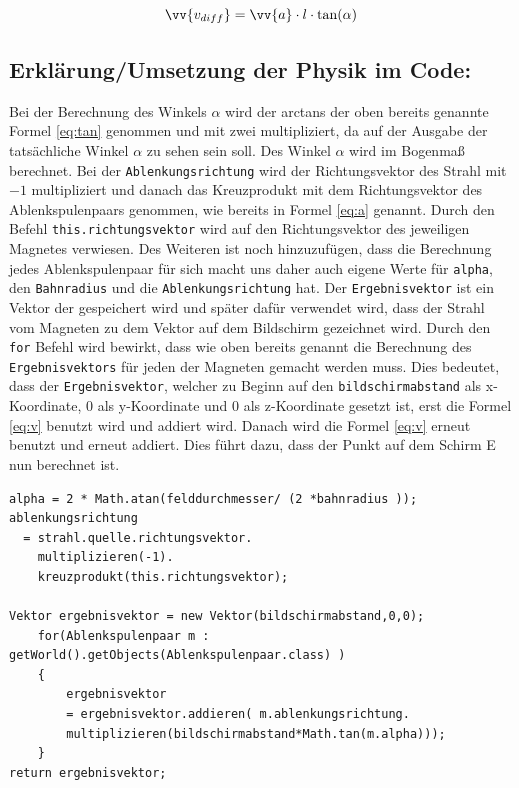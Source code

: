 \begin{equation}
    \label{eq:v}
    \vv{v_{diff}} =  \vv{a} \cdot l \cdot \tan(\alpha)
\end{equation}

\subsection{Erklärung/Umsetzung der Physik im Code:}

Bei der Berechnung des Winkels $\alpha$ wird der arctans der oben bereits genannte Formel \ref{eq:tan} genommen und mit zwei multipliziert, da auf der Ausgabe der tatsächliche Winkel $\alpha$ zu sehen sein soll.
Des Winkel $\alpha$ wird im Bogenmaß berechnet.
Bei der \lstinline$Ablenkungsrichtung$ wird der Richtungsvektor des Strahl mit $-1$ multipliziert und danach das Kreuzprodukt mit dem Richtungsvektor des Ablenkspulenpaars genommen, wie bereits in Formel \ref{eq:a} genannt.
Durch den Befehl \lstinline$this.richtungsvektor$ wird auf den Richtungsvektor des jeweiligen Magnetes verwiesen.
Des Weiteren ist noch hinzuzufügen, dass die Berechnung jedes Ablenkspulenpaar für sich macht uns daher auch eigene Werte für \lstinline$alpha$, den \lstinline$Bahnradius$ und die \lstinline$Ablenkungsrichtung$ hat.
Der \lstinline$Ergebnisvektor$ ist ein Vektor der gespeichert wird und später dafür verwendet wird, dass der Strahl vom Magneten zu dem Vektor auf dem Bildschirm gezeichnet wird.
Durch den \lstinline$for$ Befehl wird bewirkt, dass wie oben bereits genannt die Berechnung des \lstinline$Ergebnisvektors$ für jeden der Magneten gemacht werden muss.
Dies bedeutet, dass der \lstinline$Ergebnisvektor$, welcher zu Beginn auf den \lstinline$bildschirmabstand$ als x- Koordinate, $0$ als y-Koordinate und 0 als z-Koordinate gesetzt ist, erst die Formel \ref{eq:v} benutzt wird und addiert wird.
Danach wird die Formel \ref{eq:v} erneut benutzt und erneut addiert. Dies führt dazu, dass der Punkt auf dem Schirm E nun berechnet ist.

\begin{lstlisting}
alpha = 2 * Math.atan(felddurchmesser/ (2 *bahnradius ));
ablenkungsrichtung
  = strahl.quelle.richtungsvektor.
    multiplizieren(-1).
    kreuzprodukt(this.richtungsvektor);

Vektor ergebnisvektor = new Vektor(bildschirmabstand,0,0);
    for(Ablenkspulenpaar m : getWorld().getObjects(Ablenkspulenpaar.class) )
    {
        ergebnisvektor 
        = ergebnisvektor.addieren( m.ablenkungsrichtung.
        multiplizieren(bildschirmabstand*Math.tan(m.alpha)));
    }
return ergebnisvektor;

\end{lstlisting}

     
